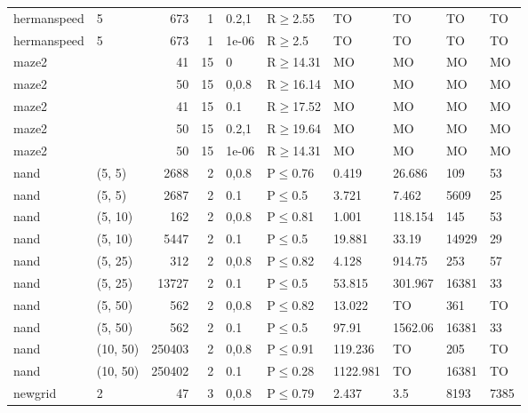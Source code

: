 \begin{longtable}{llrrllllll}
 hermanspeed   & 5        &    	673 &   1 & 0.2,1 & R$\geq$2.55  & TO       & TO      & TO      & TO      \\
 hermanspeed   & 5        &    	673 &   1 & 1e-06 & R$\geq$2.5   & TO       & TO      & TO      & TO      \\
 maze2         &          &     	41 &  15 & 0     & R$\geq$14.31 & MO       & MO      & MO      & MO      \\
 maze2         &          &     	50 &  15 & 0,0.8 & R$\geq$16.14 & MO       & MO      & MO      & MO      \\
 maze2         &          &     	41 &  15 & 0.1   & R$\geq$17.52 & MO       & MO      & MO      & MO      \\
 maze2         &          &     	50 &  15 & 0.2,1 & R$\geq$19.64 & MO       & MO      & MO      & MO      \\
 maze2         &          &     	50 &  15 & 1e-06 & R$\geq$14.31 & MO       & MO      & MO      & MO      \\
 nand          & (5, 5)   &   	2688 &   2 & 0,0.8 & P$\leq$0.76  & 0.419    & 26.686  & 109     & 53      \\
 nand          & (5, 5)   &   	2687 &   2 & 0.1   & P$\leq$0.5   & 3.721    & 7.462   & 5609    & 25      \\
 nand          & (5, 10)  &    	162 &   2 & 0,0.8 & P$\leq$0.81  & 1.001    & 118.154 & 145     & 53      \\
 nand          & (5, 10)  &   	5447 &   2 & 0.1   & P$\leq$0.5   & 19.881   & 33.19   & 14929   & 29      \\
 nand          & (5, 25)  &    	312 &   2 & 0,0.8 & P$\leq$0.82  & 4.128    & 914.75  & 253     & 57      \\
 nand          & (5, 25)  &  	13727 &   2 & 0.1   & P$\leq$0.5   & 53.815   & 301.967 & 16381   & 33      \\
 nand          & (5, 50)  &    	562 &   2 & 0,0.8 & P$\leq$0.82  & 13.022   & TO      & 361     & TO      \\
 nand          & (5, 50)  &    	562 &   2 & 0.1   & P$\leq$0.5   & 97.91    & 1562.06 & 16381   & 33      \\
 nand          & (10, 50) & 	250403 &   2 & 0,0.8 & P$\leq$0.91  & 119.236  & TO      & 205     & TO      \\
 nand          & (10, 50) & 	250402 &   2 & 0.1   & P$\leq$0.28  & 1122.981 & TO      & 16381   & TO      \\
 newgrid       & 2        &     	47 &   3 & 0,0.8 & P$\leq$0.79  & 2.437    & 3.5     & 8193    & 7385    \\

\end{longtable}
